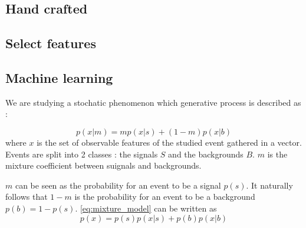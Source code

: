 
\subsection{Hand crafted} %
\label{sub:hand_crafted}




\subsection{Select features} %
\label{sub:select_features}




\subsection{Machine learning} %
\label{sub:machine_learning}




We are studying a stochatic phenomenon which generative process is described as :

\begin{equation}
	\label{eq:mixture_model}
	p(x|m) = m p(x|s) + (1-m) p(x|b)
\end{equation}
where $x$ is the set of observable features of the studied event gathered in a vector.
Events are split into 2 classes : the signals $S$ and the backgrounds $B$.
$m$ is the mixture coefficient between suignals and backgrounds.

$m$ can be seen as the probability for an event to be a signal $p(s)$. 
It naturally follows that $1-m$ is the probability for an event to be a background $p(b)=1-p(s)$.
\autoref{eq:mixture_model} can be written as
\begin{equation}
	p(x) = p(s)p(x|s) + p(b)p(x|b)
\end{equation}

